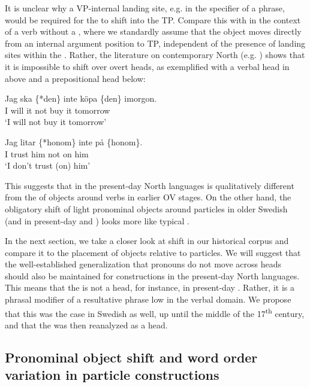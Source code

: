 \documentclass[output=paper]{langscibook}
\begin{document}
It is unclear why a VP-internal landing site, e.g. in the specifier of a  phrase, would be required for the  to shift into the TP. Compare this with  in the context of a verb without a , where we standardly assume that the object moves directly from an internal argument position to TP, independent of the presence of landing sites within the . Rather, the literature on contemporary North   (e.g. \citealt{Thrainsson2001}) shows that it is impossible to shift over overt heads, as exemplified with a verbal head in  above and a prepositional head below:


\ea\label{ex:lalu:50}
\ea
\gll Jag  ska  \{*den\}   inte   köpa   \{den\}   imorgon.\\
      I         will      it      not  buy     it     tomorrow \\
\glt  ‘I will not buy it tomorrow'

\ex
\gll Jag  litar   \{*honom\}   inte   på   \{honom\}.\\
    I     trust     him     not   on     him\\
\glt  ‘I don’t trust (on) him'
\z
\z


This suggests that  in the present-day North  languages is qualitatively different from the  of objects around verbs in earlier OV stages. On the other hand, the obligatory shift of light pronominal objects around particles in older Swedish (and in present-day  and ) looks more like typical . 



In the next section, we take a closer look at  shift in our historical corpus and compare it to the placement of objects relative to particles. We will suggest that the well-established generalization that pronouns do not move across heads should also be maintained for  constructions in the present-day North  languages. This means that the  is not a head, for instance, in present-day . Rather, it is a phrasal modifier of a resultative phrase low in the verbal domain. We propose that this was the case in Swedish as well, up until the middle of the 17\textsuperscript{th} century, and that the  was then reanalyzed as a head. 


\subsection{Pronominal object shift and word order variation in particle constructions}\label{sec:lalu:6.2}\largerpage
\end{document}
